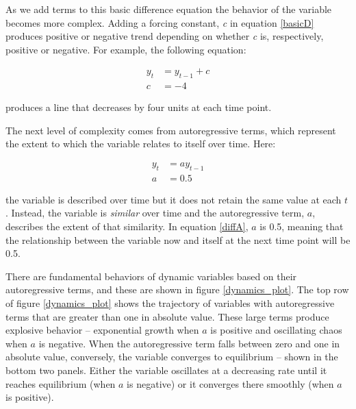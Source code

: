 \documentclass[english,,man]{apa6}
\theoremstyle{definition}
\theoremstyle{definition}
\theoremstyle{definition}
\theoremstyle{remark}
\begin{document}
As we add terms to this basic difference equation the behavior of the
variable becomes more complex. Adding a forcing constant, \emph{c} in
equation \ref{basicD} produces positive or negative trend depending on
whether \emph{c} is, respectively, positive or negative. For example,
the following equation:

\begin{equation}
\begin{split}
\label{diffC}
y_{t} &= y_{t-1} + c \\ 
c &= -4
\end{split}
\end{equation}

\noindent produces a line that decreases by four units at each time
point.

The next level of complexity comes from autoregressive terms, which
represent the extent to which the variable relates to itself over time.
Here:

\begin{equation}
\begin{split}
\label{diffA}
y_{t} &= a y_{t-1} \\ 
a &= 0.5
\end{split}
\end{equation}

\noindent the variable is described over time but it does not retain the
same value at each \(t\). Instead, the variable is \emph{similar} over
time and the autoregressive term, \(a\), describes the extent of that
similarity. In equation \ref{diffA}, \(a\) is 0.5, meaning that the
relationship between the variable now and itself at the next time point
will be 0.5.

There are fundamental behaviors of dynamic variables based on their
autoregressive terms, and these are shown in figure \ref{dynamics_plot}.
The top row of figure \ref{dynamics_plot} shows the trajectory of
variables with autoregressive terms that are greater than one in
absolute value. These large terms produce explosive behavior --
exponential growth when \(a\) is positive and oscillating chaos when
\(a\) is negative. When the autoregressive term falls between zero and
one in absolute value, conversely, the variable converges to equilibrium
-- shown in the bottom two panels. Either the variable oscillates at a
decreasing rate until it reaches equilibrium (when \(a\) is negative) or
it converges there smoothly (when \(a\) is positive).
\end{document}
